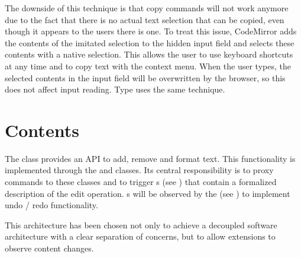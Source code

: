The downside of this technique is that copy commands will not work anymore due to the fact that there is no actual text selection that can be copied, even though it appears to the users there is one. To treat this issue, CodeMirror adds the contents of the imitated selection to the hidden input field and selects these contents with a native selection. This allows the user to use keyboard shortcuts at any time and to copy text with the context menu. When the user types, the selected contents in the input field will be overwritten by the browser, so this does not affect input reading. Type uses the same technique.





\section{Contents}
\label{sec:contents_impl}

The  class provides an API to add, remove and format text. This functionality is implemented through the  and  classes. Its central responsibility is to proxy commands to these classes and to trigger s (see ) that contain a formalized description of the edit operation. s will be observed by the  (see ) to implement undo / redo functionality.

This architecture has been chosen not only to achieve a decoupled software architecture with a clear separation of concerns, but to allow extensions to observe content changes. %



